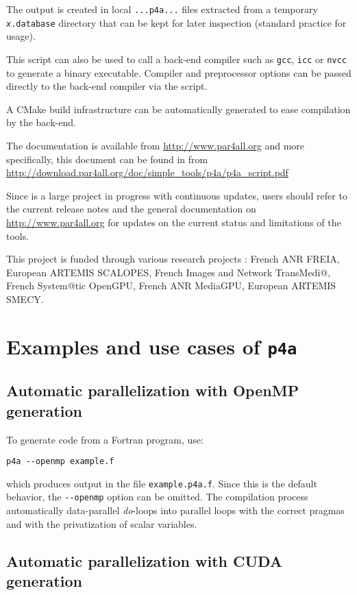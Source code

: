 \documentclass[a4paper]{article}
\begin{document}
The output is created in local \texttt{...p4a...} files extracted from a
temporary \texttt{\emph{x}.database} directory that can be kept
for later inspection (standard practice for \Apips usage).

This script can also be used to call a back-end compiler such as
\texttt{gcc}, \texttt{icc} or \texttt{nvcc} to generate a binary
executable. Compiler and preprocessor options can be passed directly
to the back-end compiler via the script.

A CMake build infrastructure can be automatically generated to ease
compilation by the back-end.

The \Apfa documentation is available from \url{http://www.par4all.org} and
more specifically, this document can be found in \Apdf from
\url{http://download.par4all.org/doc/simple_tools/p4a/p4a_script.pdf}

Since \Apfa is a large project in progress with continuous updates,
users should refer to the current release notes and the general
documentation on
\url{http://www.par4all.org} for updates on
the current status and limitations of the tools.

This project is funded through various research projects : French ANR
FREIA, European ARTEMIS SCALOPES, French Images and Network TransMedi@,
French System@tic OpenGPU, French ANR MediaGPU, European ARTEMIS SMECY.


\section{Examples and use cases of \protect\texttt{p4a}}
\label{sec:examples}

\subsection{Automatic parallelization with OpenMP generation}
\label{sec:autom-parall-with}

To generate \Aopenmp code from a Fortran program, use:
\begin{verbatim}
p4a --openmp example.f
\end{verbatim}
which produces output in the file \texttt{example.p4a.f}. Since this is
the default
behavior, the \verb/--openmp/ option can be omitted. The compilation
process automatically data-parallel \emph{do}-loops into
\Aopenmp parallel loops with the correct pragmas and with the privatization of
scalar variables.


\subsection{Automatic parallelization with CUDA generation}
\label{sec:autom-parall-with-1}
\end{document}
